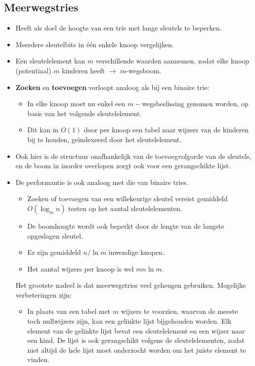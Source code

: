 \subsection{Meerwegstries}
\begin{itemize}
    \item Heeft als doel de hoogte van een trie met lange sleutels te beperken.
    \item Meerdere sleutelbits in één enkele knoop vergelijken.
    \item Een sleutelelement kan $m$ verschillende waarden aannemen, zodat elke knoop (potentiaal) $m$ kinderen heeft $\rightarrow$ $m$-wegsboom.
    \item \textbf{Zoeken} en \textbf{toevoegen} verloopt analoog als bij een binaire trie:
    \begin{itemize}
        \item In elke knoop moet nu enkel een $m-$wegsbeslissing genomen worden, op basis van het volgende sleutelelement.
        \item Dit kan in $O(1)$ door per knoop een tabel naar wijzers van de kinderen bij te houden, geïndexeerd door het sleutelelement.
    \end{itemize}
    \item Ook hier is de structuur onafhankelijk van de toevoegvolgorde van de sleutels, en de boom in inorder overlopen zorgt ook voor een gerangschikte lijst.
    \item De performantie is ook analoog met die van binaire tries.
    \begin{itemize}
        \item Zoeken of toevoegen van een willekeurige sleutel vereist gemiddeld $O(\log_m n)$ testen op het aantal sleutelelementen.
        \item De boomhoogte wordt ook beperkt door de lengte van de langste opgeslagen sleutel.
        \item Er zijn gemiddeld $n/\ln m$ inwendige knopen.
        \item Het aantal wijzers per knoop is wel $mn \ln m$.
    \end{itemize}
    \alert Het grootste nadeel is dat meerwegstries veel geheugen gebruiken. Mogelijke verbeteringen zijn:
    \begin{itemize}
        \item In plaats van een tabel met $m$ wijzers te voorzien, waarvan de meeste toch nullwijzers zijn, kan een gelinkte lijst bijgehouden worden. Elk element van de gelinkte lijst bevat een sleutelelement en een wijzer naar een kind. De lijst is ook gerangschikt volgens de sleutelelementen, zodat niet altijd de hele lijst moet onderzocht worden om het juiste element te vinden.
        

\end{itemize}
\end{itemize}
